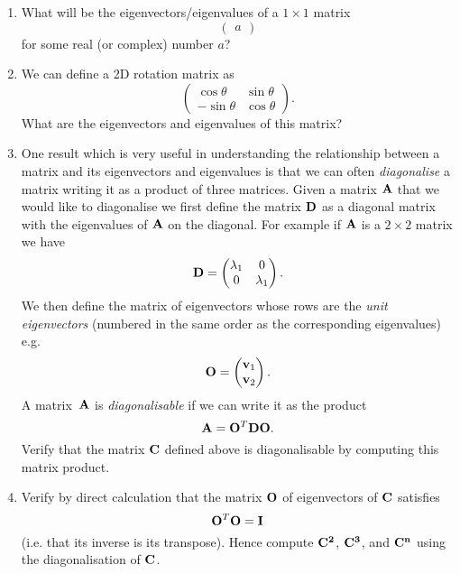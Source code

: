{\begin{enumerate}
            Considering the action of a matrix on a vector as a geometric
            transformation what do the eigenvalues represent?
        \item What will be the eigenvectors/eigenvalues of a $1 \times 1$ matrix
            \[
                \begin{pmatrix}
                    a
                \end{pmatrix}
            \]
            for some real (or complex) number $a$?
        \item We can define a 2D rotation matrix as
            \[
                \begin{pmatrix}
                    \cos{\theta} & \sin{\theta} \\
                    -\sin{\theta} & \cos{\theta}
                \end{pmatrix}.
            \]
            What are the eigenvectors and eigenvalues of this matrix?
        \item One result which is very useful in understanding the
            relationship between a matrix and its eigenvectors and eigenvalues
            is that we can often \emph{diagonalise} a matrix writing it as a
            product of three matrices. Given a matrix ${\bf A}$ that we would
            like to diagonalise we first define the matrix ${\bf D}$ as a
            diagonal matrix with the eigenvalues of ${\bf A}$ on the diagonal.
            For example if ${\bf A}$ is a $2\times 2$ matrix we have
            \[
                {\bf D} =
                \begin{pmatrix}
                    \lambda_1 & 0 \\
                    0 & \lambda_1
                \end{pmatrix}.
            \]
            We then define the matrix of eigenvectors whose rows are the
            \emph{unit eigenvectors} (numbered in the same order as the
            corresponding eigenvalues) e.g.
            \[
                {\bf O} =
                \begin{pmatrix}
                    {\bf v}_1 \\
                    {\bf v}_2
                \end{pmatrix}.
            \]
            A matrix~${\bf A}$ is \emph{diagonalisable} if we can write it as the
            product
            \[
                {\bf A} = {\bf O}^T {\bf D} {\bf O}.
            \]
            Verify that the matrix ${\bf C}$ defined above is diagonalisable
            by computing this matrix product.
        \item Verify by direct calculation that the matrix ${\bf O}$ of
            eigenvectors of ${\bf C}$ satisfies
            \[
                {\bf O}^T {\bf O} = {\bf I}
            \]
            (i.e. that its inverse is its transpose). Hence compute ${\bf
            C^2}$, ${\bf C^3}$, and ${\bf C^n}$ using the diagonalisation of
            ${\bf C}$.
    \end{enumerate}
}
